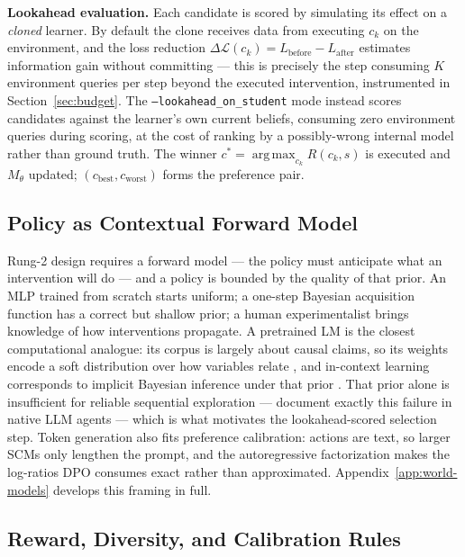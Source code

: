 \documentclass[twoside]{article}
\DeclareMathOperator*{\argmax}{arg\,max}
\theoremstyle{plain}
\theoremstyle{definition}
\theoremstyle{remark}
\begin{document}
\textbf{Lookahead evaluation.} Each candidate is scored by simulating its effect on a \emph{cloned} learner. By default the clone receives data from executing $c_k$ on the environment, and the loss reduction $\Delta\mathcal{L}(c_k) = L_\text{before} - L_\text{after}$ estimates information gain without committing --- this is precisely the step consuming $K$ environment queries per step beyond the executed intervention, instrumented in Section~\ref{sec:budget}. The \texttt{--lookahead\_on\_student} mode instead scores candidates against the learner's own current beliefs, consuming zero environment queries during scoring, at the cost of ranking by a possibly-wrong internal model rather than ground truth. The winner $c^* = \argmax_{c_k} R(c_k, s)$ is executed and $M_\theta$ updated; $(c_\text{best}, c_\text{worst})$ forms the preference pair.

\subsection{Policy as Contextual Forward Model}
\label{sec:lm-policy}

Rung-2 design requires a forward model --- the policy must anticipate what an intervention will do --- and a policy is bounded by the quality of that prior. An MLP trained from scratch starts uniform; a one-step Bayesian acquisition function has a correct but shallow prior; a human experimentalist brings knowledge of how interventions propagate. A pretrained LM is the closest computational analogue: its corpus is largely about causal claims, so its weights encode a soft distribution over how variables relate \citep{hao2023reasoning,kiciman2023causal}, and in-context learning corresponds to implicit Bayesian inference under that prior \citep{xie2022explanation}. That prior alone is insufficient for reliable sequential exploration --- \citet{krishnamurthy2024explore} document exactly this failure in native LLM agents --- which is what motivates the lookahead-scored selection step. Token generation also fits preference calibration: actions are text, so larger SCMs only lengthen the prompt, and the autoregressive factorization makes the log-ratios DPO consumes exact rather than approximated. Appendix~\ref{app:world-models} develops this framing in full.

\subsection{Reward, Diversity, and Calibration Rules}
\label{sec:dpo}
\end{document}
